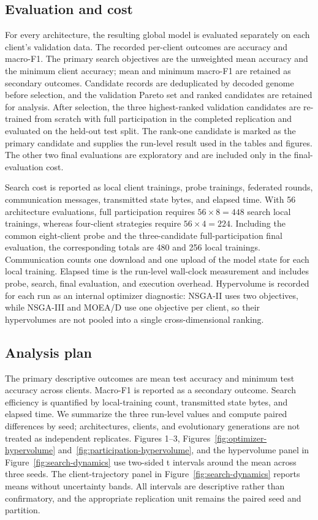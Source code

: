 \documentclass[11pt]{article}
\begin{document}
\subsection{Evaluation and cost}

For every architecture, the resulting global model is evaluated separately on each client's validation data. The recorded per-client outcomes are accuracy and macro-F1. The primary search objectives are the unweighted mean accuracy and the minimum client accuracy; mean and minimum macro-F1 are retained as secondary outcomes. Candidate records are deduplicated by decoded genome before selection, and the validation Pareto set and ranked candidates are retained for analysis. After selection, the three highest-ranked validation candidates are re-trained from scratch with full participation in the completed replication and evaluated on the held-out test split. The rank-one candidate is marked as the primary candidate and supplies the run-level result used in the tables and figures. The other two final evaluations are exploratory and are included only in the final-evaluation cost.

Search cost is reported as local client trainings, probe trainings, federated rounds, communication messages, transmitted state bytes, and elapsed time. With 56 architecture evaluations, full participation requires $56\times 8=448$ search local trainings, whereas four-client strategies require $56\times 4=224$. Including the common eight-client probe and the three-candidate full-participation final evaluation, the corresponding totals are 480 and 256 local trainings. Communication counts one download and one upload of the model state for each local training. Elapsed time is the run-level wall-clock measurement and includes probe, search, final evaluation, and execution overhead. Hypervolume is recorded for each run as an internal optimizer diagnostic: NSGA-II uses two objectives, while NSGA-III and MOEA/D use one objective per client, so their hypervolumes are not pooled into a single cross-dimensional ranking.

\subsection{Analysis plan}

The primary descriptive outcomes are mean test accuracy and minimum test accuracy across clients. Macro-F1 is reported as a secondary outcome. Search efficiency is quantified by local-training count, transmitted state bytes, and elapsed time. We summarize the three run-level values and compute paired differences by seed; architectures, clients, and evolutionary generations are not treated as independent replicates. Figures 1--3, Figures~\ref{fig:optimizer-hypervolume} and~\ref{fig:participation-hypervolume}, and the hypervolume panel in Figure~\ref{fig:search-dynamics} use two-sided t intervals around the mean across three seeds. The client-trajectory panel in Figure~\ref{fig:search-dynamics} reports means without uncertainty bands. All intervals are descriptive rather than confirmatory, and the appropriate replication unit remains the paired seed and partition.
\end{document}
